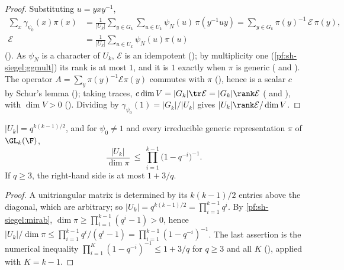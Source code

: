 \begin{proof}
Substituting $u=yxy^{-1}$,
\begin{align*}
\sum_x\gamma_{\psi_0}(x)\pi(x)&=\frac1{|U_k|}\sum_{y\in G_k}\sum_{u\in U_k}\psi_N(u)\,\pi(y^{-1}uy)=\sum_{y\in G_k}
\pi(y)^{-1}\,\mathcal E\,\pi(y),\\
\mathcal E&=\frac1{|U_k|}\sum_{u\in U_k}\psi_N(u)\pi(u)
\end{align*}
(). As $\psi_N$ is a character of $U_k$, $\mathcal E$ is an
idempotent (); by multiplicity one (\cref{pf:sh-siegel:ggmult}) its
rank is at most $1$, and it is $1$ exactly when $\pi$ is generic
( and ). The operator $A=\sum_y
\pi(y)^{-1}\mathcal E\pi(y)$ commutes with $\pi$ (), hence is a
scalar $c$ by Schur's lemma (); taking traces,
$c\dim V=|G_k|\tr\mathcal E=|G_k|\rank\mathcal E$ ( and ),
with $\dim V>0$ (). Dividing by $\gamma_{\psi_0}(1)=|G_k|/|U_k|$
gives $|U_k|\rank\mathcal E/\dim V$.
\end{proof}

\begin{lemma}\label{pf:sh-siegel:genratio}
$|U_k|=q^{k(k-1)/2}$, and for $\psi_0\ne1$ and every irreducible generic representation $\pi$ of $\GL_k(\F)$,
\[
\frac{|U_k|}{\dim\pi}\ \le\ \prod_{i=1}^{k-1}\bigl(1-q^{-i}\bigr)^{-1}.
\]
If $q\ge3$, the right-hand side is at most $1+3/q$.
\end{lemma}

\begin{proof}
A unitriangular matrix is determined by its $k(k-1)/2$ entries above the diagonal, which are arbitrary; so
$|U_k|=q^{k(k-1)/2}=\prod_{i=1}^{k-1}q^i$. By \cref{pf:sh-siegel:mirab}, $\dim\pi\ge\prod_{i=1}^{k-1}(q^i-1)>0$, hence
$|U_k|/\dim\pi\le\prod_{i=1}^{k-1}q^i/(q^i-1)=\prod_{i=1}^{k-1}(1-q^{-i})^{-1}$. The last assertion is the numerical
inequality $\prod_{i=1}^{K}(1-q^{-i})^{-1}\le1+3/q$ for $q\ge3$ and all $K$
(), applied with $K=k-1$.
\end{proof}

